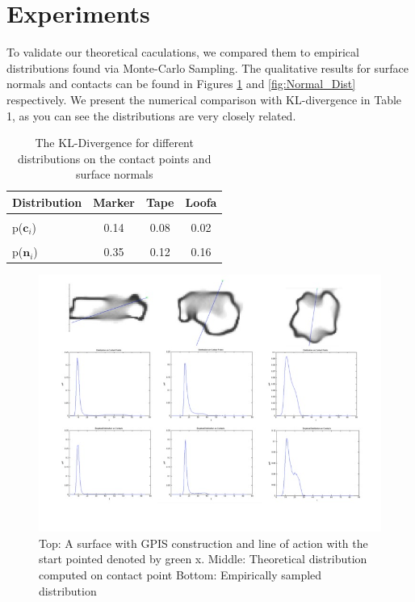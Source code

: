 \documentclass[letterpaper, 10 pt, conference]{ieeeconf}  %
\begin{document}
\section{Experiments}

To validate our theoretical caculations, we compared them to empirical distributions found via Monte-Carlo Sampling. The qualitative results for surface normals and contacts can be found in Figures \ref{fig:Contact_Dist} and \ref{fig:Normal_Dist} respectively. We present the numerical comparison with KL-divergence in Table 1, as you can see the distributions are very closely related. 

\begin{table}[h]
        \begin{tabular}{ l | c c c}
         Distribution & \bf Marker & \bf Tape & \bf Loofa \\ 
        \hline \\
         p($\textbf{c}_i$) & 0.14 & 0.08 & 0.02 \\
        \hline \\
        p($\textbf{n}_i$)& 0.35 & 0.12 & 0.16 \\
        \hline 
        \end{tabular}
        \caption{The KL-Divergence for different distributions on the contact points and surface normals}
		
        \vspace*{-10pt}
\end{table}


\begin{figure}[h]
\centering
\includegraphics[scale = 0.3]{figures/Slide07.jpg}
\caption{Top: A surface with GPIS construction and line of action with the start pointed denoted by green x.
Middle: Theoretical distribution computed on contact point
Bottom: Empirically sampled distribution}
\vspace*{-10pt}
\label{fig:Contact_Dist}
\end{figure}
\end{document}
